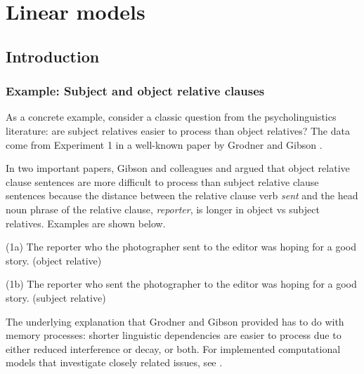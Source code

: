 \documentclass[12pt]{book}\usepackage[]{graphicx}\usepackage[]{color}
\begin{document}







\chapter{Linear models}

\section{Introduction}

\subsection{Example: Subject and object relative clauses}

As a concrete example, consider a classic question from the psycholinguistics literature: are subject relatives easier to process than object relatives? The data come from Experiment 1 in a well-known paper by Grodner and Gibson \cite{grodner}.

In two important papers, Gibson and colleagues \cite{gibson00} and \cite{grodner} argued that object relative clause sentences are more difficult to process than subject relative clause sentences because the distance between the relative clause verb \textit{sent} and the head noun phrase of the relative clause, \textit{reporter}, is longer in object vs subject relatives. Examples are shown below.

(1a) The reporter who the photographer sent to the editor was hoping for a good story. (object relative)

(1b) The reporter who sent the photographer to the editor was hoping for a good story. (subject relative)

The underlying explanation that Grodner and Gibson provided has to do with memory processes: shorter linguistic dependencies are easier to process due to either reduced interference or decay, or both. For implemented computational models that investigate closely related issues, see \cite{lewisvasishth:cogsci05,EngelmannJaegerVasishthSubmitted2018}.
\end{document}
